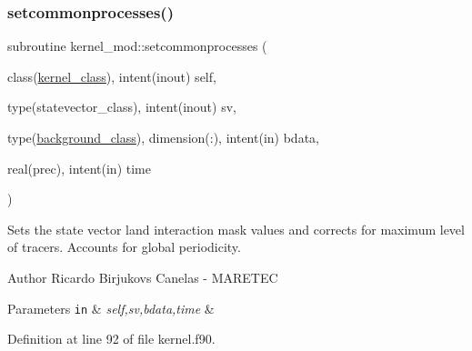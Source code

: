 \subsubsection{\texorpdfstring{setcommonprocesses()}{setcommonprocesses()}}
{\footnotesize\ttfamily subroutine kernel\+\_\+mod\+::setcommonprocesses (\begin{DoxyParamCaption}\item[{class(\mbox{\hyperlink{structkernel__mod_1_1kernel__class}{kernel\+\_\+class}}), intent(inout)}]{self,  }\item[{type(statevector\+\_\+class), intent(inout)}]{sv,  }\item[{type(\mbox{\hyperlink{structbackground__mod_1_1background__class}{background\+\_\+class}}), dimension(\+:), intent(in)}]{bdata,  }\item[{real(prec), intent(in)}]{time }\end{DoxyParamCaption})}



Sets the state vector land interaction mask values and corrects for maximum level of tracers. Accounts for global periodicity. 

\begin{DoxyAuthor}{Author}
Ricardo Birjukovs Canelas -\/ M\+A\+R\+E\+T\+EC 
\end{DoxyAuthor}

\begin{DoxyParams}[1]{Parameters}
\mbox{\tt in}  & {\em self,sv,bdata,time} & \\
\hline
\end{DoxyParams}


Definition at line 92 of file kernel.\+f90.


